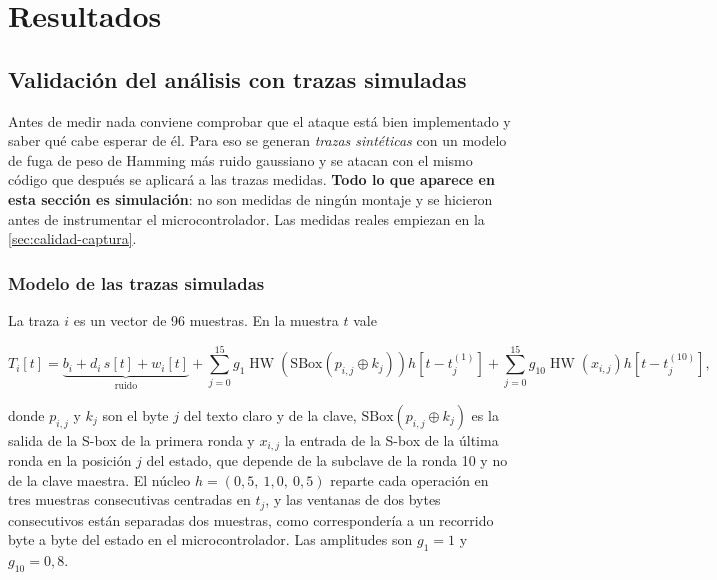 \chapter{Resultados}
\label{cap:resultados}

\section{Validación del análisis con trazas simuladas}
\label{sec:validacion-simulada}

Antes de medir nada conviene comprobar que el ataque está bien implementado y
saber qué cabe esperar de él. Para eso se generan \emph{trazas sintéticas} con
un modelo de fuga de peso de Hamming más ruido gaussiano y se atacan con el
mismo código que después se aplicará a las trazas medidas. \textbf{Todo lo que
aparece en esta sección es simulación}: no son medidas de ningún montaje y se
hicieron antes de instrumentar el microcontrolador. Las medidas reales empiezan
en la \cref{sec:calidad-captura}.

\subsection{Modelo de las trazas simuladas}

La traza $i$ es un vector de 96 muestras. En la muestra $t$ vale

\begin{equation}
  T_i[t] = \underbrace{b_i + d_i\,s[t] + w_i[t]}_{\text{ruido}}
         + \sum_{j=0}^{15} g_1 \operatorname{HW}\!\left(\mathrm{SBox}(p_{i,j} \oplus k_j)\right) h[t - t^{(1)}_j]
         + \sum_{j=0}^{15} g_{10} \operatorname{HW}\!\left(x_{i,j}\right) h[t - t^{(10)}_j],
  \label{eq:modelo-traza}
\end{equation}

donde $p_{i,j}$ y $k_j$ son el byte $j$ del texto claro y de la clave,
$\mathrm{SBox}(p_{i,j} \oplus k_j)$ es la salida de la S-box de la primera
ronda y $x_{i,j}$ la entrada de la S-box de la última ronda en la posición $j$
del estado, que depende de la subclave de la ronda 10 y no de la clave
maestra. El núcleo $h = (0{,}5,\ 1{,}0,\ 0{,}5)$ reparte cada operación en tres
muestras consecutivas centradas en $t_j$, y las ventanas de dos bytes
consecutivos están separadas dos muestras, como correspondería a un recorrido
byte a byte del estado en el microcontrolador. Las amplitudes son $g_1 = 1$ y
$g_{10} = 0{,}8$.

